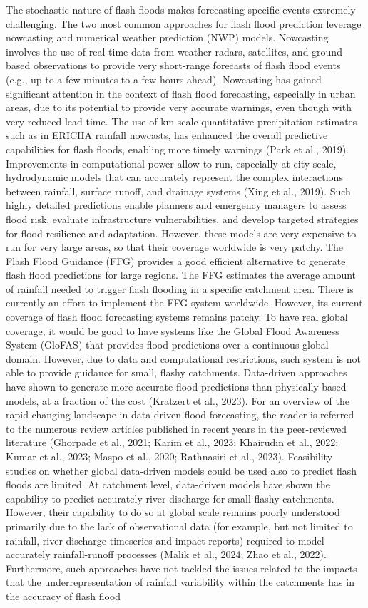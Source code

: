 \documentclass[nhess, manuscript]{copernicus}
\begin{document}
The stochastic nature of flash floods makes forecasting specific events extremely challenging. The two most common approaches for flash flood prediction leverage nowcasting and numerical weather prediction (NWP) models. Nowcasting involves the use of real-time data from weather radars, satellites, and ground-based observations to provide very short-range forecasts of flash flood events (e.g., up to a few minutes to a few hours ahead). Nowcasting has gained significant attention in the context of flash flood forecasting, especially in urban areas, due to its potential to provide very accurate warnings, even though with very reduced lead time. The use of km-scale quantitative precipitation estimates such as in ERICHA rainfall nowcasts, has enhanced the overall predictive capabilities for flash floods, enabling more timely warnings (Park et al., 2019). Improvements in computational power allow to run, especially at city-scale, hydrodynamic models that can accurately represent the complex interactions between rainfall, surface runoff, and drainage systems (Xing et al., 2019). Such highly detailed predictions enable planners and emergency managers to assess flood risk, evaluate infrastructure vulnerabilities, and develop targeted strategies for flood resilience and adaptation. However, these models are very expensive to run for very large areas, so that their coverage worldwide is very patchy. The Flash Flood Guidance (FFG) provides a good efficient alternative to generate flash flood predictions for large regions. The FFG estimates the average amount of rainfall needed to trigger flash flooding in a specific catchment area. There is currently an effort to implement the FFG system worldwide. However, its current coverage of flash flood forecasting systems remains patchy. To have real global coverage, it would be good to have systems like the Global Flood Awareness System (GloFAS) that provides flood predictions over a continuous global domain. However, due to data and computational restrictions, such system is not able to provide guidance for small, flashy catchments. Data-driven approaches have shown to generate more accurate flood predictions than physically based models, at a fraction of the cost (Kratzert et al., 2023). For an overview of the rapid-changing landscape in data-driven flood forecasting, the reader is referred to the numerous review articles published in recent years in the peer-reviewed literature (Ghorpade et al., 2021; Karim et al., 2023; Khairudin et al., 2022; Kumar et al., 2023; Maspo et al., 2020; Rathnasiri et al., 2023). Feasibility studies on whether global data-driven models could be used also to predict flash floods are limited. At catchment level, data-driven models have shown the capability to predict accurately river discharge for small flashy catchments. However, their capability to do so at global scale remains poorly understood primarily due to the lack of observational data (for example, but not limited to rainfall, river discharge  timeseries and impact reports) required to model accurately rainfall-runoff processes (Malik et al., 2024; Zhao et al., 2022). Furthermore, such approaches have not tackled the issues related to the impacts that the underrepresentation of rainfall variability within the catchments has in the accuracy of flash flood 
\end{document}
